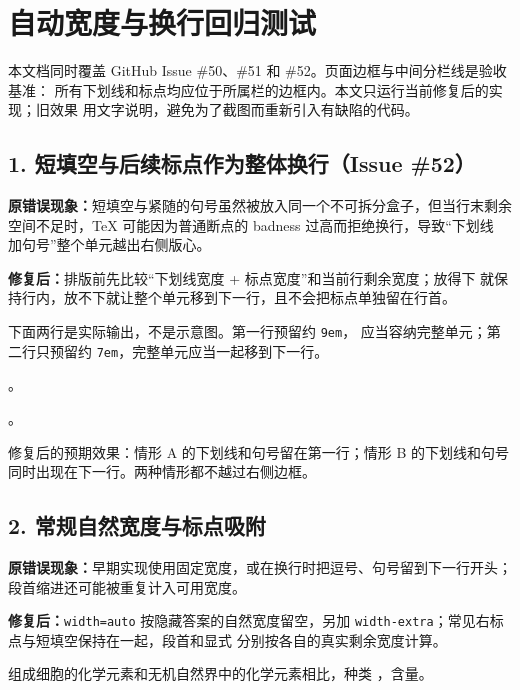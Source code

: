 \documentclass{exam-zh}
\newcommand\regressionnote[1]{%
  \par\smallskip
  \noindent
  \colorbox{RegressionGray}{%
    \parbox{\dimexpr\linewidth-2\fboxsep\relax}{#1}%
  }%
  \par\smallskip
}
\newcommand\oldbehavior[1]{%
  \par\noindent\textbf{原错误现象：}#1\par
}
\newcommand\fixedbehavior[1]{%
  \par\noindent\textcolor{RegressionGreen}{\textbf{修复后：}}#1\par
}
\begin{document}
\raggedbottom

\section*{\texttt{\string\fillin} 自动宽度与换行回归测试}

本文档同时覆盖 GitHub Issue \#50、\#51 和 \#52。页面边框与中间分栏线是验收基准：
所有下划线和标点均应位于所属栏的边框内。本文只运行当前修复后的实现；旧效果
用文字说明，避免为了截图而重新引入有缺陷的代码。

\subsection*{1. 短填空与后续标点作为整体换行（Issue \#52）}

\oldbehavior{短填空与紧随的句号虽然被放入同一个不可拆分盒子，但当行末剩余
空间不足时，TeX 可能因为普通断点的 badness 过高而拒绝换行，导致“下划线
加句号”整个单元越出右侧版心。}

\fixedbehavior{排版前先比较“下划线宽度 + 标点宽度”和当前行剩余宽度；放得下
就保持行内，放不下就让整个单元移到下一行，且不会把标点单独留在行首。}

\regressionnote{下面两行是实际输出，不是示意图。第一行预留约 \texttt{9em}，
应当容纳完整单元；第二行只预留约 \texttt{7em}，完整单元应当一起移到下一行。}

\noindent
{}%
\fillin*[生物化学反应]。

\medskip

\noindent
{}%
\fillin*[生物化学反应]。

\regressionnote{修复后的预期效果：情形 A 的下划线和句号留在第一行；情形 B
的下划线和句号同时出现在下一行。两种情形都不越过右侧边框。}

\subsection*{2. 常规自然宽度与标点吸附}

\oldbehavior{早期实现使用固定宽度，或在换行时把逗号、句号留到下一行开头；
段首缩进还可能被重复计入可用宽度。}

\fixedbehavior{\texttt{width=auto} 按隐藏答案的自然宽度留空，另加
\texttt{width-extra}；常见右标点与短填空保持在一起，段首和显式
\texttt{\string\noindent} 分别按各自的真实剩余宽度计算。}

\begin{question}
  组成细胞的化学元素和无机自然界中的化学元素相比，种类
  \fillin*[大体相同]，含量\fillin*[差异很大]。
\end{question}
\end{document}
